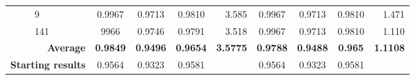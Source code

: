 \begin{table}
\begin{tabular}{ll|cccr|cccr}
        & 9 & 0.9967 & 0.9713 & 0.9810 & 3.585 & 0.9967 & 0.9713 & 0.9810 & 1.471\\
        & 141 & 9966 & 0.9746 & 0.9791 & 3.518 & 0.9967 & 0.9713 & 0.9810 & 1.110\\
        \cmidrule{1-10}
        \multicolumn{2}{r|}{\textbf{Average}} & \textbf{0.9849} & \textbf{0.9496} & \textbf{0.9654} & \textbf{3.5775} & \textbf{0.9788} & \textbf{0.9488} & \textbf{0.965} & \textbf{1.1108}\\
        \cmidrule{1-10}
        \multicolumn{2}{r|}{\textbf{Starting results}} & 0.9564 & 0.9323 & 0.9581 & & 0.9564 & 0.9323 & 0.9581 & \\
        \bottomrule
    \end{tabular}
    \normalsize
\end{table}
\renewcommand{\arraystretch}{1}

